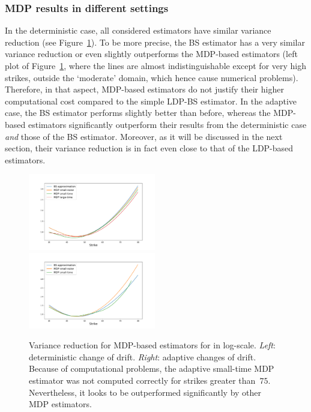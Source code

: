 \subsubsection{MDP results in different settings}

In the deterministic case, all considered estimators have similar variance reduction (see Figure~\ref{fig:MDPvarianceRedu}). 
To be more precise, the BS estimator has a very similar variance reduction or even slightly outperforms the MDP-based estimators (left plot of Figure~\ref{fig:MDPvarianceRedu}, where the lines are almost indistinguishable except for very high strikes, outside the `moderate' domain, which hence cause numerical problems). Therefore, in that aspect, MDP-based estimators do not justify their higher computational cost compared to the simple LDP-BS estimator. In the adaptive case, the BS estimator performs slightly better than before, whereas the MDP-based estimators significantly outperform their results from the deterministic case \textit{and} those of the BS estimator. Moreover, as it will be discussed in the next section, their variance reduction is in fact even close to that of the LDP-based estimators.
\begin{figure}[H]
    \centering
    \includegraphics[width=0.495\textwidth, trim={2cm 0.5cm 2cm 1cm }]{content/reschap3/Figures/HESTON/compare-mdp-new.pdf}
    \includegraphics[width=0.495\textwidth, trim={2cm 0.5cm 2cm 1cm }]{content/reschap3/Figures/HESTON/compare-mdpada1-new.pdf}
    \caption{Variance reduction for MDP-based estimators for in log-scale. \textit{Left}: deterministic change of drift. \textit{Right}: adaptive changes of drift. Because of computational problems, the adaptive small-time MDP estimator was not computed correctly for strikes greater than~$75$. Nevertheless, it looks to be outperformed significantly by other MDP estimators.}\label{fig:MDPvarianceRedu}
\end{figure}

